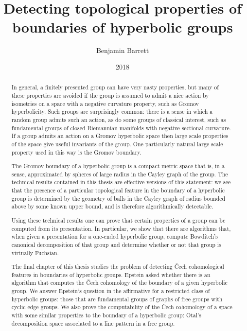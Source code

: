\documentclass{article}
\title{Detecting topological properties of boundaries of hyperbolic groups}
\author{Benjamin Barrett}
\date{2018}
\begin{document}
\maketitle
\begin{abstract}

In general, a finitely presented group can have very nasty properties, but many of these properties are avoided if the group is assumed to admit a nice action by isometries on a space with a negative curvature property, such as Gromov hyperbolicity. 
Such groups are surprisingly common: there is a sense in which a random group admits such an action, as do some groups of classical interest, such as fundamental groups of closed Riemannian manifolds with negative sectional curvature. 
If a group admits an action on a Gromov hyperbolic space then large scale properties of the space give useful invariants of the group.  
One particularly natural large scale property used in this way is the Gromov boundary.

The Gromov boundary of a hyperbolic group is a compact metric space that is, in a sense, approximated by spheres of large radius in the Cayley graph of the group. 
The technical results contained in this thesis are effective versions of this statement: we see that the presence of a particular topological feature in the boundary of a hyperbolic group is determined by the geometry of balls in the Cayley graph of radius bounded above by some known upper bound, and is therefore algorithmically detectable. 

Using these technical results one can prove that certain properties of a group can be computed from its presentation.
In particular, we show that there are algorithms that, when given a presentation for a one-ended hyperbolic group, compute Bowditch's canonical decomposition of that group and determine whether or not that group is virtually Fuchsian.

The final chapter of this thesis studies the problem of detecting \v{C}ech cohomological features in boundaries of hyperbolic groups.
Epstein asked whether there is an algorithm that computes the \v{C}ech cohomology of the boundary of a given hyperbolic group.
We answer Epstein's question in the affirmative for a restricted class of hyperbolic groups: those that are fundamental groups of graphs of free groups with cyclic edge groups.
We also prove the computability of the \v{C}ech cohomology of a space with some similar properties to the boundary of a hyperbolic group: Otal's decomposition space associated to a line pattern in a free group.

\end{abstract}
\end{document}
